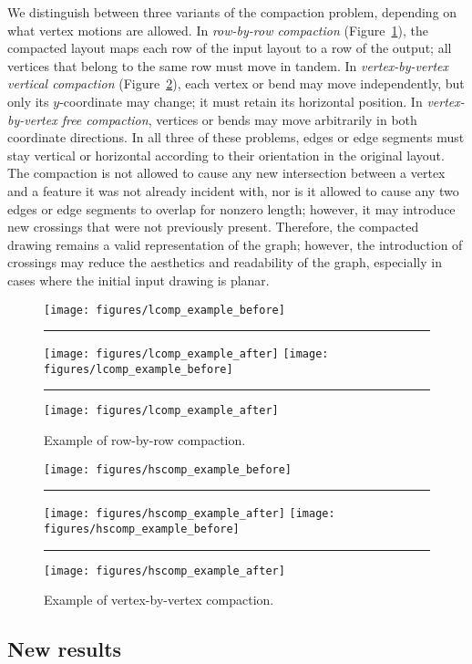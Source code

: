 \documentclass[12pt]{article}
\theoremstyle{definitions}
\begin{document}
We distinguish between three variants of the compaction problem, depending on what vertex motions are allowed. In \emph{row-by-row compaction} (Figure~\ref{fig:rxreg}), the compacted layout maps each row of the input layout to a row of the output; all vertices that belong to the same row must move in tandem. In \emph{vertex-by-vertex vertical compaction} (Figure~\ref{fig:vxveg}), each vertex or bend may move independently, but only its $y$-coordinate may change; it must retain its horizontal position. In \emph{vertex-by-vertex free compaction}, vertices or bends may move arbitrarily in both coordinate directions. In all three of these problems, edges or edge segments must stay vertical or horizontal according to their orientation in the original layout. The compaction is not allowed to cause any new intersection between a vertex and a feature it was not already incident with, nor is it allowed to cause any two edges or edge segments to overlap for nonzero length; however, it may introduce new crossings that were not previously present. Therefore, the compacted drawing remains a valid representation of the graph; however, the introduction of crossings may reduce the aesthetics and readability of the graph, especially in cases where the initial input drawing is planar.

\begin{figure}[ht!]
\centering
\ifFull
\texttt{[image: figures/lcomp\_example\_before]}\rule{4em}{0em}
\texttt{[image: figures/lcomp\_example\_after]}
\else
\texttt{[image: figures/lcomp\_example\_before]}\rule{4em}{0em}
\texttt{[image: figures/lcomp\_example\_after]}
\fi
\caption{Example of row-by-row compaction.}
\label{fig:rxreg}
\end{figure}

\begin{figure}[ht!]
\centering
\ifFull
\texttt{[image: figures/hscomp\_example\_before]}\rule{4em}{0em}
\texttt{[image: figures/hscomp\_example\_after]}
\else
\texttt{[image: figures/hscomp\_example\_before]}\rule{4em}{0em}
\texttt{[image: figures/hscomp\_example\_after]}
\fi
\caption{Example of vertex-by-vertex compaction.}
\label{fig:vxveg}
\end{figure}

\subsection{New results}
\end{document}
